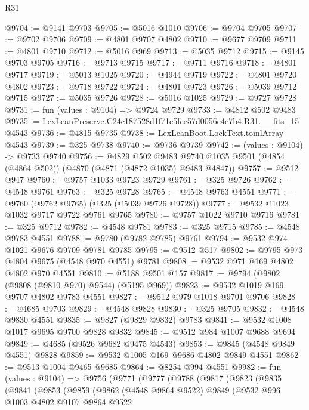 \begin{lexlean}{R31}
\begin{coremodule}
@9704 := @9141 @9703
@9705 := @5016 @1010
@9706 := @9704 @9705
@9707 := @9702 @9706
@9709 := @4801 @9707 @4802
@9710 := @9677 @9709
@9711 := @4801 @9710
@9712 := @5016 @969
@9713 := @5035 @9712
@9715 := @9145 @9703 @9705
@9716 := @9713 @9715
@9717 := @9711 @9716
@9718 := @4801 @9717
@9719 := @5013 @1025
@9720 := @4944 @9719
@9722 := @4801 @9720 @4802
@9723 := @9718 @9722
@9724 := @4801 @9723
@9726 := @5039 @9712 @9715
@9727 := @5035 @9726
@9728 := @5016 @1025
@9729 := @9727 @9728
@9731 := fun (values : @9104) => @9724 @9729
@9733 := @4812 @502 @9483
@9735 := LexLeanPreserve.C24c187528d1f71c5fce57d0056e4e7b4.R31.__fits_15 @4543
@9736 := @4815 @9735
@9738 := LexLeanBoot.LockText.tomlArray @4543
@9739 := @325 @9738
@9740 := @9736 @9739
@9742 := (values : @9104) -> @9733 @9740
@9756 := @4829
    @502
    @9483
    @9740
    @1035
    @9501
    (@4854 (@4864 @502))
    (@4870 (@4871 (@4872 @1035) @9483 @4847))
@9757 := @9512 @947
@9760 := @9757 @1033 @9723 @9729
@9761 := @325 @9726
@9762 := @4548 @9761
@9763 := @325 @9728
@9765 := @4548 @9763 @4551
@9771 := @9760 (@9762 @9765) (@325 (@5039 @9726 @9728))
@9777 := @9532 @1023 @1032 @9717 @9722 @9761 @9765
@9780 := @9757 @1022 @9710 @9716
@9781 := @325 @9712
@9782 := @4548 @9781
@9783 := @325 @9715
@9785 := @4548 @9783 @4551
@9788 := @9780 (@9782 @9785) @9761
@9794 := @9532 @974 @1021 @9676 @9709 @9781 @9785
@9795 := @9512 @517
@9802 := @9795 @973 @4804 @9675 (@4548 @970 @4551) @9781
@9808 := @9532 @971 @169 @4802 @4802 @970 @4551
@9810 := @5188 @9501 @157
@9817 := @9794 (@9802 (@9808 (@9810 @970) @9544) (@5195 @969))
@9823 := @9532 @1019 @169 @9707 @4802 @9783 @4551
@9827 := @9512 @979 @1018 @9701 @9706
@9828 := @4685 @9703
@9829 := @4548 @9828
@9830 := @325 @9705
@9832 := @4548 @9830 @4551
@9835 := @9827 (@9829 @9832) @9783
@9841 := @9532 @1008 @1017 @9695 @9700 @9828 @9832
@9845 := @9512 @984 @1007 @9688 @9694
@9849 := @4685 (@9526 @9682 @9475 @4543)
@9853 := @9845 (@4548 @9849 @4551) @9828
@9859 := @9532 @1005 @169 @9686 @4802 @9849 @4551
@9862 := @9513 @1004 @9465 @9685
@9864 := @8254 @994 @4551
@9982 := fun (values : @9104) =>
  @9756
    (@9771
      (@9777
        (@9788
          (@9817
            (@9823
              (@9835
                (@9841
                  (@9853
                    (@9859
                      (@9862
                        (@4548 @9864 @9522)
                        @9849
                        (@9532
                          @996
                          @1003
                          @4802
                          @9107
                          @9864
                          @9522

\end{coremodule}
\end{lexlean}
